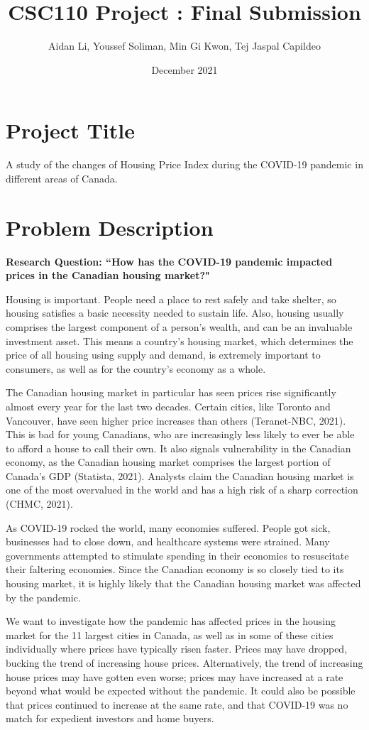 \documentclass{article}
\title{CSC110 Project : Final Submission}
\author{Aidan Li, Youssef Soliman, Min Gi Kwon, Tej Jaspal Capildeo}
\date{December 2021}
\begin{document}
\maketitle

\section{Project Title}
A study of the changes of Housing Price Index during the COVID-19 pandemic in different areas of Canada.

\section{Problem Description}
\textbf{Research Question: “How has the COVID-19 pandemic impacted prices in the Canadian housing market?"}

Housing is important. People need a place to rest safely and take shelter, so housing satisfies a basic necessity needed to sustain life. Also, housing usually comprises the largest component of a person’s wealth, and can be an invaluable investment asset. This means a country’s housing market, which determines the price of all housing using supply and demand, is extremely important to consumers, as well as for the country’s economy as a whole.

The Canadian housing market in particular has seen prices rise significantly almost every year for the last two decades. Certain cities, like Toronto and Vancouver, have seen higher price increases than others (Teranet-NBC, 2021). This is bad for young Canadians, who are increasingly less likely to ever be able to afford a house to call their own. It also signals vulnerability in the Canadian economy, as the Canadian housing market comprises the largest portion of Canada’s GDP (Statista, 2021). Analysts claim the Canadian housing market is one of the most overvalued in the world and has a high risk of a sharp correction (CHMC, 2021).

As COVID-19 rocked the world, many economies suffered. People got sick, businesses had to close down, and healthcare systems were strained. Many governments attempted to stimulate spending in their economies to resuscitate their faltering economies. Since the Canadian economy is so closely tied to its housing market, it is highly likely that the Canadian housing market was affected by the pandemic.

We want to investigate how the pandemic has affected prices in the housing market for the 11 largest cities in Canada, as well as in some of these cities individually where prices have typically risen faster. Prices may have dropped, bucking the trend of increasing house prices. Alternatively, the trend of increasing house prices may have gotten even worse; prices may have increased at a rate beyond what would be expected without the pandemic. It could also be possible that prices continued to increase at the same rate, and that COVID-19 was no match for expedient investors and home buyers.
\end{document}
